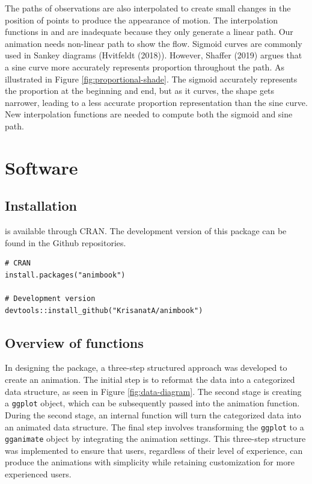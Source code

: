 The paths of observations are also interpolated to create small changes in the position of points to produce the appearance of motion. The interpolation functions in  and  are inadequate because they only generate a linear path. Our animation needs non-linear path to show the flow. Sigmoid curves are commonly used in Sankey diagrams (Hvitfeldt (2018)). However, Shaffer (2019) argues that a sine curve more accurately represents proportion throughout the path. As illustrated in Figure \ref{fig:proportional-shade}. The sigmoid accurately represents the proportion at the beginning and end, but as it curves, the shape gets narrower, leading to a less accurate proportion representation than the sine curve. New interpolation functions are needed to compute both the sigmoid and sine path.

\hypertarget{software}{%
\section{Software}\label{software}}

\hypertarget{installation}{%
\subsection{Installation}\label{installation}}

 is available through CRAN. The development version of this package can be found in the Github repositories.

\begin{verbatim}
# CRAN
install.packages("animbook")

# Development version
devtools::install_github("KrisanatA/animbook")
\end{verbatim}

\hypertarget{overview-of-functions}{%
\subsection{Overview of functions}\label{overview-of-functions}}

In designing the  package, a three-step structured approach was developed to create an animation. The initial step is to reformat the data into a categorized data structure, as seen in Figure \ref{fig:data-diagram}. The second stage is creating a \texttt{ggplot} object, which can be subsequently passed into the animation function. During the second stage, an internal function will turn the categorized data into an animated data structure. The final step involves transforming the \texttt{ggplot} to a \texttt{gganimate} object by integrating the animation settings. This three-step structure was implemented to ensure that users, regardless of their level of experience, can produce the animations with simplicity while retaining customization for more experienced users.

